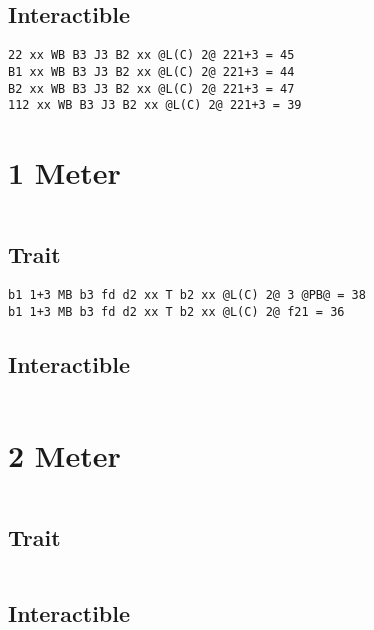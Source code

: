 \documentclass[main.tex]{subfiles}
\begin{document}
\subsection{Interactible}
\begin{lstlisting}[language=FG]
22 xx WB B3 J3 B2 xx @L(C) 2@ 221+3 = 45
B1 xx WB B3 J3 B2 xx @L(C) 2@ 221+3 = 44
B2 xx WB B3 J3 B2 xx @L(C) 2@ 221+3 = 47
112 xx WB B3 J3 B2 xx @L(C) 2@ 221+3 = 39
\end{lstlisting}

\section{1 Meter}


\begin{lstlisting}[language=FG]
\end{lstlisting}

\subsection{Trait}
\begin{lstlisting}[language=FG]
b1 1+3 MB b3 fd d2 xx T b2 xx @L(C) 2@ 3 @PB@ = 38
b1 1+3 MB b3 fd d2 xx T b2 xx @L(C) 2@ f21 = 36 
\end{lstlisting}


\subsection{Interactible}
\begin{lstlisting}[language=FG]

\end{lstlisting}

\section{2 Meter}


\begin{lstlisting}[language=FG]
\end{lstlisting}

\subsection{Trait}

\begin{lstlisting}[language=FG]
\end{lstlisting}


\subsection{Interactible}
\begin{lstlisting}[language=FG]

\end{lstlisting}
\end{document}
